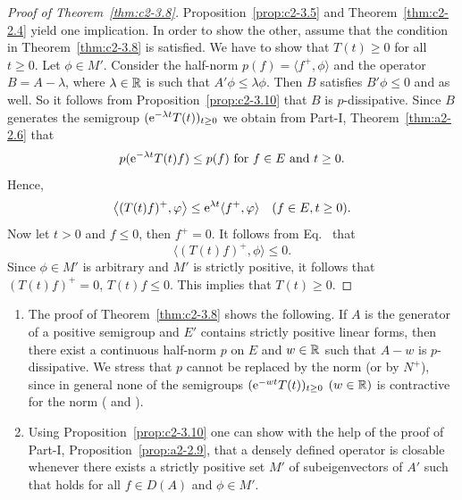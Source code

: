 \begin{proof}[Proof of Theorem~\ref{thm:c2-3.8}]
Proposition~\ref{prop:c2-3.5} and Theorem~\ref{thm:c2-2.4}   yield one implication. 
In order to show the other, assume that the condition in
Theorem~\ref{thm:c2-3.8}   is satisfied. 
We have to show that $T(t) \geq 0$ for all $t \geq 0$.
Let $\phi \in M'$. 
Consider the half-norm $p(f) = \langle f^{+},\phi \rangle$ and the operator $B = A - \lambda$, where $\lambda \in \mathbb{R}$ is such that $A'\phi \leq \lambda\phi$. 
Then $B$ satisfies $B'\phi \leq 0$ and    as well. 
So it follows from Proposition~\ref{prop:c2-3.10}   that $B$ is $p$-dissipative.
Since $B$ generates the semigroup $(\eu^{-\lambda t}T(t))_{t \geq 0}$ we obtain from Part-I, Theorem~\ref{thm:a2-2.6} that 
\[
p(\eu^{-\lambda t}T(t)f) \leq p(f) \text{ for } f \in E \text{ and } t\geq 0 .
\]
Hence,
\begin{equation} \label{eq:c2-3.5}
\left\langle (T(t)f)^{+}, \phi \right\rangle \leq \eu^{\lambda t} \langle f^{+}, \phi \rangle \quad (f \in E, t \geq 0).
\end{equation}
Now let $t > 0$ and $f \leq 0$, then $f^{+} = 0$. 
It follows from  Eq.~ that 
\[
\langle (T(t)f)^{+},\phi \rangle \leq 0 .
\]
Since $\phi \in M'$ is arbitrary and $M'$ is strictly positive, it follows that $(T(t)f)^{+} = 0$, \ie $T(t)f \leq 0$. 
This implies that $T(t) \geq 0$.
\end{proof}
\begin{remark}\label{rem:c2-3.11}
\begin{enumerate}[\upshape (i), wide, labelindent=.25em]%
\item \label{rem:c2-3.11-1}
The proof of Theorem~\ref{thm:c2-3.8}   shows the following. 
If\/ $A$ is the generator of a positive semigroup and $E'$ contains strictly
positive linear forms, then there exist a continuous half-norm $p$ on
$E$ and $w \in \mathbb{R}$ such that $A - w$ is $p$-dissipative. 
We stress that $p$ cannot be replaced by the norm (or by $N^{+}$), since in general none of the semigroups $(\eu^{-wt}T(t))_{t \geq 0}$ $(w \in \mathbb{R})$ is contractive for the norm (\cf \textcite{derndinger:1984} and \textcite{battydavies:1983}).
\item  \label{rem:c2-3.11-2}
Using Proposition~\ref{prop:c2-3.10}   one can show with the help of the proof of 
Part-I, Proposition~\ref{prop:a2-2.9}, that a densely defined operator is closable whenever
there exists a strictly positive set $M'$ of subeigenvectors of\/ $A'$
such that    holds for all $f \in D(A)$ and $\phi \in M'$.
\end{enumerate}
\end{remark}
